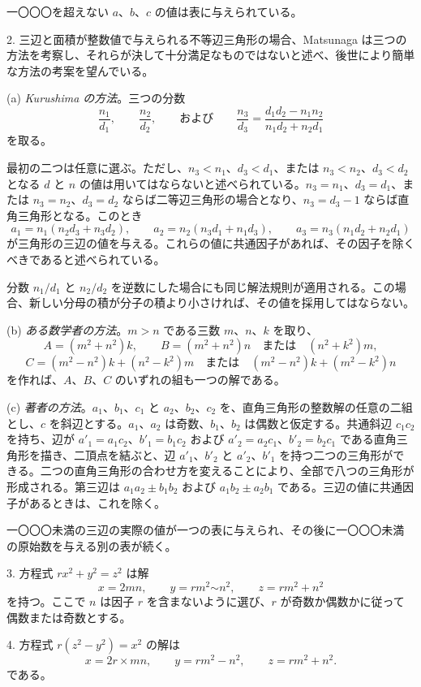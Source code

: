 \documentclass[11pt]{article}
\newcommand{\scanpage}[2]{\clearpage\setcounter{footnote}{0}\noindent{\footnotesize\color{gray}PDF #1 頁 · #2}\par\medskip}
\newcommand{\scanfooter}{}
\begin{document}
一〇〇〇を超えない $a$、$b$、$c$ の値は表に与えられている。

2. 三辺と面積が整数値で与えられる不等辺三角形の場合、Matsunaga は三つの方法を考察し、それらが決して十分満足なものではないと述べ、後世により簡単な方法の考案を望んでいる。

(a) \emph{Kurushima の方法}。三つの分数
\[
\frac{n_1}{d_1},\qquad \frac{n_2}{d_2},\qquad\text{および}\qquad
\frac{n_3}{d_3}=\frac{d_1d_2-n_1n_2}{n_1d_2+n_2d_1}
\]
を取る。
\scanfooter

\scanpage{0245}{第32章、印刷頁231}
最初の二つは任意に選ぶ。ただし、$n_3<n_1$、$d_3<d_1$、または $n_3<n_2$、$d_3<d_2$ となる $d$ と $n$ の値は用いてはならないと述べられている。$n_3=n_1$、$d_3=d_1$、または $n_3=n_2$、$d_3=d_2$ ならば二等辺三角形の場合となり、$n_3=d_3-1$ ならば直角三角形となる。このとき
\[
a_1=n_1(n_2d_3+n_3d_2),\qquad a_2=n_2(n_3d_1+n_1d_3),\qquad a_3=n_3(n_1d_2+n_2d_1)
\]
が三角形の三辺の値を与える。これらの値に共通因子があれば、その因子を除くべきであると述べられている。

分数 $n_1/d_1$ と $n_2/d_2$ を逆数にした場合にも同じ解法規則が適用される。この場合、新しい分母の積が分子の積より小さければ、その値を採用してはならない。

(b) \emph{ある数学者の方法}。$m>n$ である三数 $m$、$n$、$k$ を取り、
\[
A=(m^2+n^2)k,\qquad B=(m^2+n^2)n\quad\text{または}\quad(n^2+k^2)m,
\]
\[
C=(m^2-n^2)k+(n^2-k^2)m\quad\text{または}\quad(m^2-n^2)k+(m^2-k^2)n
\]
を作れば、$A$、$B$、$C$ のいずれの組も一つの解である。

(c) \emph{著者の方法}。$a_1$、$b_1$、$c_1$ と $a_2$、$b_2$、$c_2$ を、直角三角形の整数解の任意の二組とし、$c$ を斜辺とする。$a_1$、$a_2$ は奇数、$b_1$、$b_2$ は偶数と仮定する。共通斜辺 $c_1c_2$ を持ち、辺が $a'_1=a_1c_2$、$b'_1=b_1c_2$ および $a'_2=a_2c_1$、$b'_2=b_2c_1$ である直角三角形を描き、二頂点を結ぶと、辺 $a'_1$、$b'_2$ と $a'_2$、$b'_1$ を持つ二つの三角形ができる。二つの直角三角形の合わせ方を変えることにより、全部で八つの三角形が形成される。第三辺は $a_1a_2\pm b_1b_2$ および $a_1b_2\pm a_2b_1$ である。三辺の値に共通因子があるときは、これを除く。

一〇〇〇未満の三辺の実際の値が一つの表に与えられ、その後に一〇〇〇未満の原始数を与える別の表が続く。

3. 方程式 $rx^2+y^2=z^2$ は解
\[
x=2mn,\qquad y=rm^2\mathord{\sim}n^2,\qquad z=rm^2+n^2
\]
を持つ。ここで $n$ は因子 $r$ を含まないように選び、$r$ が奇数か偶数かに従って偶数または奇数とする。

4. 方程式 $r(z^2-y^2)=x^2$ の解は
\[
x=2r\times mn,\qquad y=rm^2-n^2,\qquad z=rm^2+n^2.
\]
である。
\scanfooter
\end{document}
